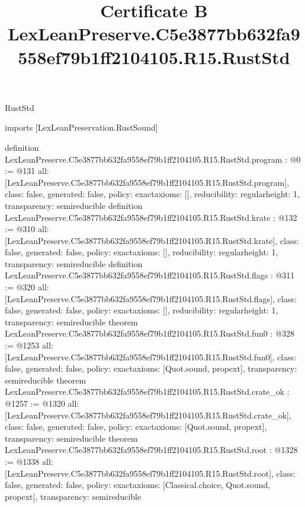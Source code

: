 \begin{lexlean}{RustStd}
\title{Certificate B LexLeanPreserve.C5e3877bb632fa9558ef79b1ff2104105.R15.RustStd}
\begin{coremodule}
imports [LexLeanPreservation.RustSound]

definition LexLeanPreserve.C5e3877bb632fa9558ef79b1ff2104105.R15.RustStd.program : @0 := @131 {
  all: [LexLeanPreserve.C5e3877bb632fa9558ef79b1ff2104105.R15.RustStd.program],
  class: false,
  generated: false,
  policy: exact{axioms: []},
  reducibility: regular{height: 1},
  transparency: semireducible
}
definition LexLeanPreserve.C5e3877bb632fa9558ef79b1ff2104105.R15.RustStd.krate : @132 := @310 {
  all: [LexLeanPreserve.C5e3877bb632fa9558ef79b1ff2104105.R15.RustStd.krate],
  class: false,
  generated: false,
  policy: exact{axioms: []},
  reducibility: regular{height: 1},
  transparency: semireducible
}
definition LexLeanPreserve.C5e3877bb632fa9558ef79b1ff2104105.R15.RustStd.flags : @311 := @320 {
  all: [LexLeanPreserve.C5e3877bb632fa9558ef79b1ff2104105.R15.RustStd.flags],
  class: false,
  generated: false,
  policy: exact{axioms: []},
  reducibility: regular{height: 1},
  transparency: semireducible
}
theorem LexLeanPreserve.C5e3877bb632fa9558ef79b1ff2104105.R15.RustStd.fun0 : @328 := @1253 {
  all: [LexLeanPreserve.C5e3877bb632fa9558ef79b1ff2104105.R15.RustStd.fun0],
  class: false,
  generated: false,
  policy: exact{axioms: [Quot.sound, propext]},
  transparency: semireducible
}
theorem LexLeanPreserve.C5e3877bb632fa9558ef79b1ff2104105.R15.RustStd.crate_ok : @1257 := @1320 {
  all: [LexLeanPreserve.C5e3877bb632fa9558ef79b1ff2104105.R15.RustStd.crate_ok],
  class: false,
  generated: false,
  policy: exact{axioms: [Quot.sound, propext]},
  transparency: semireducible
}
theorem LexLeanPreserve.C5e3877bb632fa9558ef79b1ff2104105.R15.RustStd.root : @1328 := @1338 {
  all: [LexLeanPreserve.C5e3877bb632fa9558ef79b1ff2104105.R15.RustStd.root],
  class: false,
  generated: false,
  policy: exact{axioms: [Classical.choice, Quot.sound, propext]},
  transparency: semireducible
}


\end{coremodule}
\end{lexlean}
